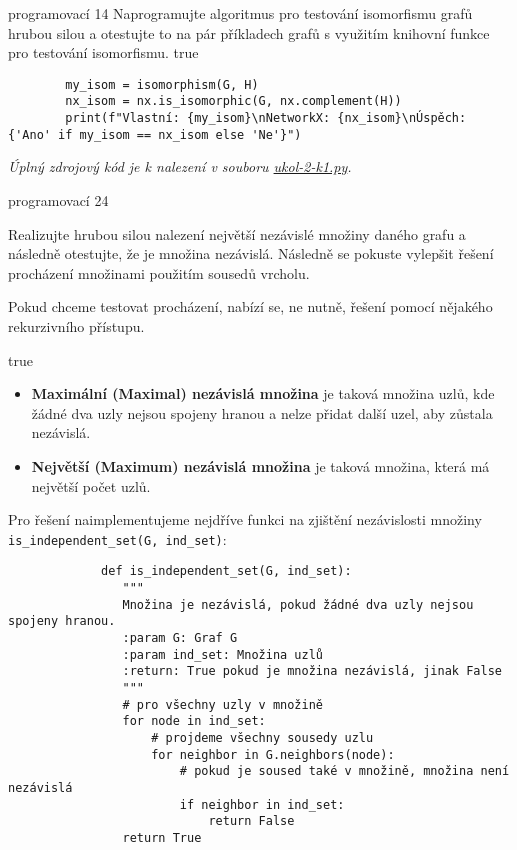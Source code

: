 \documentclass[10pt, a4paper]{ReportSheet}
\begin{document}
\begin{uloha}{programovací 1}{4}{
        Naprogramujte algoritmus pro testování isomorfismu grafů hrubou silou a otestujte to na pár příkladech grafů s využitím knihovní funkce pro testování isomorfismu.
    }{true}
\begin{verbatim}
        my_isom = isomorphism(G, H)
        nx_isom = nx.is_isomorphic(G, nx.complement(H))
        print(f"Vlastní: {my_isom}\nNetworkX: {nx_isom}\nÚspěch: {'Ano' if my_isom == nx_isom else 'Ne'}")
        \end{verbatim}

        \textit{
            Úplný zdrojový kód je k nalezení v souboru \href{https://github.com/filipditrich/MMAD-2024/blob/main/ukol-2-k1.py}{ukol-2-k1.py}.
        }
    \end{uloha}

    \begin{uloha}{programovací 2}{4}{
        Realizujte hrubou silou nalezení největší nezávislé množiny daného grafu a následně otestujte, že je množina nezávislá. Následně se pokuste vylepšit řešení procházení množinami použitím sousedů vrcholu.

        Pokud chceme testovat procházení, nabízí se, ne nutně, řešení pomocí nějakého rekurzivního přístupu.
    }{true}
        \begin{itemize}
            \item \textbf{Maximální (Maximal) nezávislá množina} je taková množina uzlů, kde žádné dva uzly nejsou spojeny
            hranou a nelze přidat další uzel, aby zůstala nezávislá.
            \item \textbf{Největší (Maximum) nezávislá množina} je taková množina, která má největší počet uzlů.
        \end{itemize}

        Pro řešení naimplementujeme nejdříve funkci na zjištění nezávislosti množiny \texttt{is\_independent\_set(G,~ind\_set)}:
        \begin{verbatim}
             def is_independent_set(G, ind_set):
                """
                Množina je nezávislá, pokud žádné dva uzly nejsou spojeny hranou.
                :param G: Graf G
                :param ind_set: Množina uzlů
                :return: True pokud je množina nezávislá, jinak False
                """
                # pro všechny uzly v množině
                for node in ind_set:
                    # projdeme všechny sousedy uzlu
                    for neighbor in G.neighbors(node):
                        # pokud je soused také v množině, množina není nezávislá
                        if neighbor in ind_set:
                            return False
                return True
        \end{verbatim}


\end{uloha}
\end{document}
